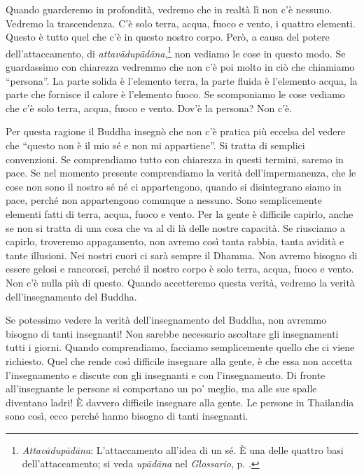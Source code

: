 Quando guarderemo in profondità, vedremo che in realtà lì
non c'è nessuno. Vedremo la trascendenza. C'è solo terra, acqua, fuoco e
vento, i quattro elementi. Questo è tutto quel che c'è in questo nostro
corpo. Però, a causa del potere dell'attaccamento, di
\emph{attavādupādāna},\footnote{\emph{Attavādupādāna}: L'attaccamento
  all'idea di un sé. È una delle quattro basi dell'attaccamento; si
  veda \emph{upādāna} nel \emph{Glossario}, p. \pageref{glossary-upadana}.} non vediamo le cose in
questo modo. Se guardassimo con chiarezza vedremmo che non c'è poi molto
in ciò che chiamiamo ``persona''. La parte solida è l'elemento terra, la
parte fluida è l'elemento acqua, la parte che fornisce il calore è
l'elemento fuoco. Se scomponiamo le cose vediamo che c'è solo terra,
acqua, fuoco e vento. Dov'è la persona? Non c'è.

Per questa ragione il Buddha insegnò che non c'è pratica più eccelsa del
vedere che ``questo non è il mio sé e non mi appartiene''. Si tratta di
semplici convenzioni. Se comprendiamo tutto con chiarezza in questi
termini, saremo in pace. Se nel momento presente comprendiamo la verità
dell'impermanenza, che le cose non sono il nostro sé né ci appartengono,
quando si disintegrano siamo in pace, perché non appartengono comunque a
nessuno. Sono semplicemente elementi fatti di terra, acqua, fuoco e
vento. Per la gente è difficile capirlo, anche se non si tratta di una
cosa che va al di là delle nostre capacità. Se riusciamo a capirlo,
troveremo appagamento, non avremo così tanta rabbia, tanta avidità e
tante illusioni. Nei nostri cuori ci sarà sempre il Dhamma. Non avremo
bisogno di essere gelosi e rancorosi, perché il nostro corpo è solo
terra, acqua, fuoco e vento. Non c'è nulla più di questo. Quando
accetteremo questa verità, vedremo la verità dell'insegnamento del
Buddha.

Se potessimo vedere la verità dell'insegnamento del Buddha, non avremmo
bisogno di tanti insegnanti! Non sarebbe necessario ascoltare gli
insegnamenti tutti i giorni. Quando comprendiamo, facciamo semplicemente
quello che ci viene richiesto. Quel che rende così difficile insegnare
alla gente, è che essa non accetta l'insegnamento e discute con gli
insegnanti e con l'insegnamento. Di fronte all'insegnante le persone si
comportano un po' meglio, ma alle sue spalle diventano ladri! È davvero
difficile insegnare alla gente. Le persone in Thailandia sono così, ecco
perché hanno bisogno di tanti insegnanti.


